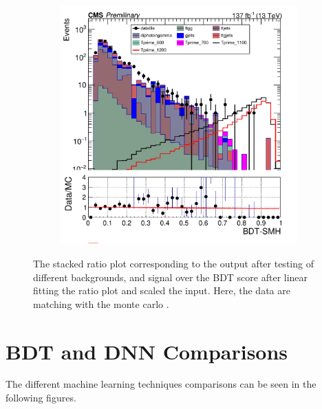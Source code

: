 \begin{figure}[H]
\begin{subfigure}[b]{0.3\textwidth}
         \label{fig:three sin x}
     \end{subfigure}
    \hfill
     \begin{subfigure}[b]{0.3\textwidth}
         \centering
         \includegraphics[width=\textwidth]{BDT_Output/Stacked_plot_BDT_1100-1200_with_diphoton_cuts_with_scaled_inputs.pdf}
         \label{fig:three sin x}
     \end{subfigure}
     \label{fig:BDT_ouput_Fitted}
     \caption{The stacked ratio plot corresponding to the output after testing of different backgrounds, and signal over the BDT score after linear fitting the ratio plot and scaled the input. Here, the data are matching with the monte carlo .}
\end{figure}




\section{BDT and DNN Comparisons}
The different machine learning techniques comparisons can be seen in the following figures.

